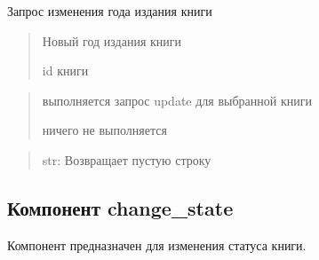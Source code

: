 \documentclass[letterpaper,10pt,russian]{sphinxmanual}
\begin{document}
\begin{fulllineitems}
\label{\detokenize{blueprints:blueprints.change_book_information.change_year}}
\pysigstartsignatures
{}
\pysigstopsignatures
\sphinxAtStartPar
Запрос изменения года издания книги
\begin{description}
\begin{quote}\begin{description}
\sphinxAtStartPar
Новый год издания книги

\sphinxAtStartPar
id книги

\end{description}\end{quote}

\begin{quote}\begin{description}
\sphinxAtStartPar
выполняется запрос update для выбранной книги

\sphinxAtStartPar
ничего не выполняется

\end{description}\end{quote}

\end{description}
\begin{quote}\begin{description}
\sphinxAtStartPar
str: Возвращает пустую строку

\end{description}\end{quote}

\end{fulllineitems}



\subsection{Компонент change\_state}
\label{\detokenize{blueprints:change-state}}
\begin{DUlineblock}{0em}
\item[] Компонент предназначен для изменения статуса книги.
\end{DUlineblock}
\label{\detokenize{blueprints:module-blueprints.change_state}}
\end{document}
